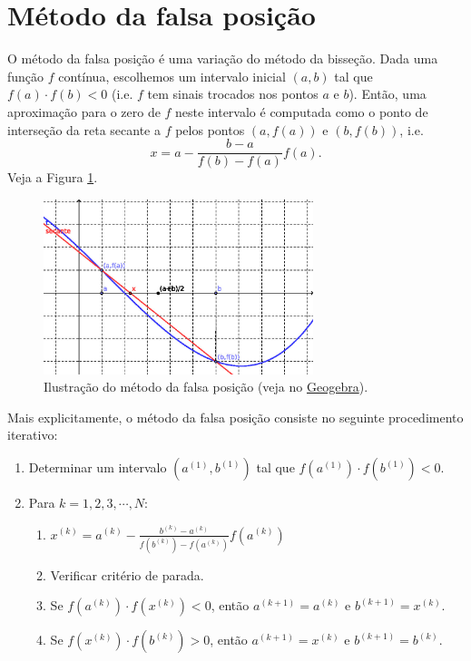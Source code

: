 \section{Método da falsa posição}\label{cap_eq1d_sec_falsapos}

O método da falsa posição é uma variação do método da bisseção. Dada uma função $f$ contínua, escolhemos um intervalo inicial $(a, b)$ tal que $f(a)\cdot f(b) < 0$ (i.e. $f$ tem sinais trocados nos pontos $a$ e $b$). Então, uma aproximação para o zero de $f$ neste intervalo é computada como o ponto de interseção da reta secante a $f$ pelos pontos $(a, f(a))$ e $(b, f(b))$, i.e.
\begin{equation}
  x = a - \frac{b-a}{f(b)-f(a)}f(a).
\end{equation}
Veja a Figura \ref{fig:falsapos}.

\begin{figure}[h!]
  \centering
  \includegraphics[width=0.7\textwidth]{./cap_eq1d/dados/fig_falsapos/fig_falsapos}
  \caption{Ilustração do método da falsa posição (veja no \href{https://github.com/phkonzen/notas/blob/master/src/MatematicaNumerica/cap_eq1d/dados/fig_falsapos/fig_falsapos.ggb}{Geogebra}).}
  \label{fig:falsapos}
\end{figure}

Mais explicitamente, o método da falsa posição consiste no seguinte procedimento iterativo:
\begin{enumerate}
\item Determinar um intervalo $(a^{(1)}, b^{(1)})$ tal que $f(a^{(1)})\cdot f(b^{(1)}) < 0$.
\item Para $k = 1, 2, 3, \cdots, N$:
  \begin{enumerate}[2.1]
  \item $\displaystyle x^{(k)} = a^{(k)} - \frac{b^{(k)}-a^{(k)}}{f(b^{(k)})-f(a^{(k)})}f(a^{(k)})$
  \item Verificar critério de parada.
  \item Se $f(a^{(k)})\cdot f(x^{(k)}) < 0$, então $a^{(k+1)}=a^{(k)}$ e $b^{(k+1)}=x^{(k)}$.
  \item Se $f(x^{(k)})\cdot f(b^{(k)}) > 0$, então $a^{(k+1)}=x^{(k)}$ e $b^{(k+1)}=b^{(k)}$.
  \end{enumerate}
\end{enumerate}

